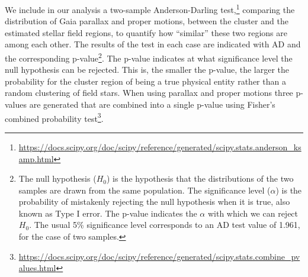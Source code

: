 \documentclass[draft]{aa}
\begin{document}
We include in our analysis a two-sample Anderson-Darling
test,\footnote{\url{https://docs.scipy.org/doc/scipy/reference/generated/scipy.stats.anderson_ksamp.html}}
comparing the distribution of Gaia parallax and proper motions,
between the cluster and the estimated stellar field regions, to quantify how
``similar'' these two regions are among each other.
The results of the test in each case are indicated with AD and the
corresponding p-value\footnote{The null hypothesis ($H_{0}$) is the
hypothesis that the distributions of the two samples are drawn from the same
population. The significance level ($\alpha$) is the probability of mistakenly
rejecting the null hypothesis when it is true, also known as Type I error. The
p-value indicates the $\alpha$ with which we can reject $H_{0}$. The usual 5\%
significance level corresponds to an AD test value of 1.961, for the case of two
samples.}. The p-value indicates at what significance level the null hypothesis
can be rejected. This is, the smaller the p-value, the larger the probability
for the cluster region of being a true physical entity rather than a random
clustering of field stars. When using parallax and proper motions three
p-values are generated that are combined into a single p-value using Fisher's
combined probability test\footnote{\url{https://docs.scipy.org/doc/scipy/reference/generated/scipy.stats.combine_pvalues.html}}.









\end{document}
